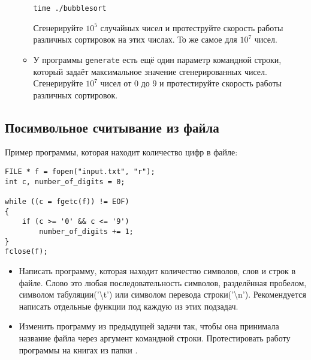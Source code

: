 \documentclass{article}
\begin{document}
\begin{itemize}
\begin{itemize}
\begin{verbatim}
time ./bubblesort
\end{verbatim}
Сгенерируйте $10^5$ случайных чисел и протеструйте скорость работы различных сортировок на этих числах. То же самое для $10^7$ чисел.
\item У программы \texttt{generate} есть ещё один параметр командной строки, который задаёт максимальное значение сгенерированных чисел. Сгенерируйте $10^7$ чисел от $0$ до $9$ и протестируйте скорость работы различных сортировок.
\end{itemize}
\end{itemize}

\subsection*{Посимвольное считывание из файла}
Пример программы, которая находит количество цифр в файле:
\begin{lstlisting}
FILE * f = fopen("input.txt", "r");
int c, number_of_digits = 0;

while ((c = fgetc(f)) != EOF)
{
    if (c >= '0' && c <= '9')
        number_of_digits += 1;
}
fclose(f);
\end{lstlisting}
\begin{itemize}
\item Написать программу, которая находит количество символов, слов и строк в файле. Слово это любая последовательность символов, разделённая пробелом, символом табуляции('\textbackslash t') или символом перевода строки('\textbackslash n'). Рекомендуется написать отдельные функции под каждую из этих подзадач.
\item Изменить программу из предыдущей задачи так, чтобы она принимала название файла через аргумент командной строки. Протестировать работу программы на книгах из папки .
\end{itemize}
\end{document}

